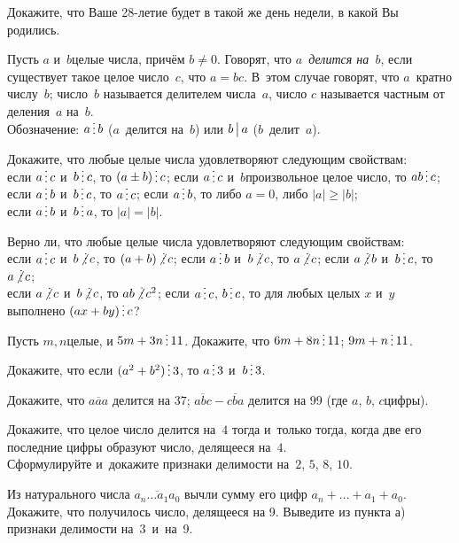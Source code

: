 \documentclass[a4paper,12pt]{article}
\newcommand{\ndv}{\smash{\mskip3mu\not\lower1truept\hbox{\vdots}\mskip3mu}}
\begin{document}

Докажите, что Ваше 28-летие будет в такой же день недели, в какой Вы родились. 

Пусть $a$ и~$b$\т целые числа, причём $b\ne 0$. Говорят, что \emph{$a$~делится на~$b$}, если существует такое целое число~$c$, что $a=bc$. В~этом случае говорят, что $a$~ кратно числу~$b$; число~$b$ называется  делителем числа~$a$, число $c$ называется  частным от деления~$a$ на~$b$. \\
Обозначение: $a \dv b$ ($a$~делится на~$b$) или $b \,\bigl\rvert\, a$ ($b$~делит~$a$).

Докажите, что любые целые числа удовлетворяют следующим свойствам:\\
если $a \dv c$ и~$b \dv c$, то $(a\pm b)\dv c$;
если $a \dv c$ и~$b$\т произвольное целое число, то $ab \dv c$;\\
если $a \dv b$ и~$b \dv c$, то $a \dv c$;
если $a \dv b$, то либо $a=0$, либо $|a| \ge |b|$;\\
если $a \dv b$ и~$b \dv a$, то $|a|=|b|$.

Верно ли, что любые целые числа удовлетворяют следующим свойствам:\\
если $a \dv c$ и~$b \ndv c$, то $(a+b)\ndv c$;
если $a \dv b$ и~$b \ndv c$, то $a\ndv c$;
если $a\ndv b$ и~$b\dv c$, то $a\ndv c$;\\
если $a\ndv c$ и~$b\ndv c$, то $ab\ndv c^2$;
если $a\dv c$, $b\dv c$, то для любых целых $x$ и~$y$ выполнено $(ax+by)\dv c$?

Пусть $m,n$\т целые, и $5m + 3n\dv11$. Докажите, что
$6m+8n\dv11$;
$9m + n\dv11$.

Докажите, что если $(a^2+b^2)\dv 3$, то $a\dv 3$ и~$b\dv 3$.

Докажите, что
$\overline{aaa}$ делится на $37$;
$\overline{abc} - \overline{cba}$ делится на 99 (где $a$, $b$, $c$\т цифры). 

Докажите, что целое число делится на~$4$ тогда и~только тогда, когда две его последние цифры образуют число, делящееся на~$4$.\\
Сформулируйте и~докажите признаки делимости на~$2$, $5$, $8$, $10$.

Из натурального числа $\overline{a_n\ldots a_1a_0}$ вычли сумму его цифр $a_n + \ldots + a_1 + a_0$. Докажите, что получилось число, делящееся на 9.
Выведите из пункта а) признаки делимости на~3~и~на~9.
\end{document}
